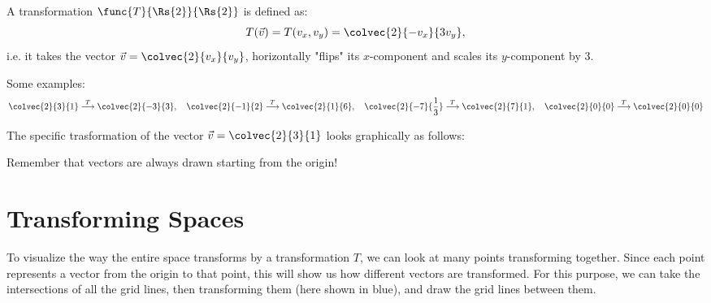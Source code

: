 \begin{example}
  A transformation $\func{T}{\Rs{2}}{\Rs{2}}$ is defined as:
  \begin{equation*}
  T(\vec{v}) = T(v_{x}, v_{y}) = \colvec{2}{-v_{x}}{3v_{y}},
  \end{equation*}
  i.e. it takes the vector $\vec{v}=\colvec{2}{v_{x}}{v_{y}}$, horizontally "flips" its $x$-component and scales its $y$-component by 3.

  Some examples:
  \begin{equation*}
  \colvec{2}{3}{1}\overset{T}{\longrightarrow}\colvec{2}{-3}{3},\quad\colvec{2}{-1}{2}\overset{T}{\longrightarrow}\colvec{2}{1}{6},\quad\colvec{2}{-7}{\frac{1}{3}}\overset{T}{\longrightarrow}\colvec{2}{7}{1},\quad\colvec{2}{0}{0}\overset{T}{\longrightarrow}\colvec{2}{0}{0}
  \end{equation*}
 
  The specific trasformation of the vector $\vec{v}=\colvec{2}{3}{1}$ looks graphically as follows:
  \begin{figure}[H]
  \centering
  \end{figure}
\end{example}

\begin{warning}
  Remember that vectors are always drawn starting from the origin!
\end{warning}

\section{Transforming Spaces}
To visualize the way the entire space transforms by a transformation $T$, we can look at many points transforming together. Since each point represents a vector from the origin to that point, this will show us how different vectors are transformed. For this purpose, we can take the intersections of all the grid lines, then transforming them (here shown in blue), and draw the grid lines between them.

